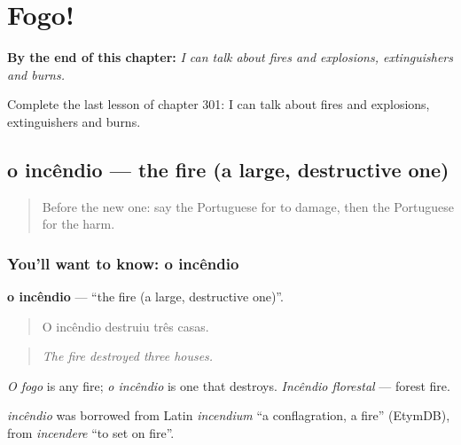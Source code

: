 
\chapter{Fogo!}
\label{ch:pt-fogo}

\begin{chapteropening}
\textbf{By the end of this chapter:} \emph{I can talk about fires and explosions, extinguishers and burns.}

Complete the last lesson of chapter 301: I can talk about fires and explosions, extinguishers and burns.
\end{chapteropening}

\section[o incêndio]{o incêndio — the fire (a large, destructive one)}

\label{lesson:PT-C301-incendio}



\begin{quote}
Before the new one: say the Portuguese for to damage, then the Portuguese for the harm.
\end{quote}

\subsection*{You'll want to know: o incêndio}
\textbf{o incêndio} — \textquotedblleft{}the fire (a large, destructive one)\textquotedblright{}.

\begin{quote}
O incêndio destruiu três casas.
\end{quote}

\begin{quote}
\emph{The fire destroyed three houses.}
\end{quote}

\emph{O fogo} is any fire; \emph{o incêndio} is one that destroys. \emph{Incêndio florestal} — forest fire.

\begin{cousinweb}
\emph{incêndio} was borrowed from Latin \emph{incendium} \textquotedblleft{}a conflagration, a fire\textquotedblright{} (EtymDB), from \emph{incendere} \textquotedblleft{}to set on fire\textquotedblright{}.
\end{cousinweb}

